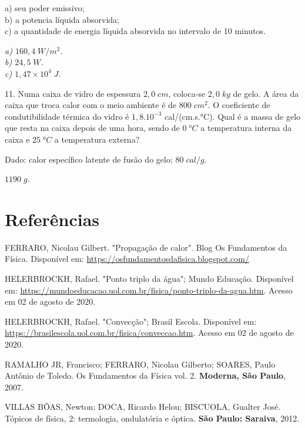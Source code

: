 \documentclass[12pt,twoside]{article}
\newenvironment{resposta*}
{\bf Resposta:\\ }
{}
\begin{document}
a) seu poder emissivo; \\
b) a potencia líquida absorvida; \\
c) a quantidade de energia líquida absorvida no intervalo de 10 minutos.


\begin{resposta*}
{\it a) $160,4\;W/m^{2}$. \\
b) $24,5\;W$. \\
c) $1,47\times 10^{4}\;J$.}
\end{resposta*}

11. Numa caixa de vidro de espessura $2,0\;cm$, coloca-se $2,0\;kg$ de gelo. A área da caixa que troca calor com o meio ambiente é de $800\;cm^{2}$. O coeficiente de condutibilidade térmica do vidro é $1,8.10^{-3}$ cal/(cm.s.°C). Qual é a massa de gelo que resta na caixa depois de uma hora, sendo de $0\;°C$ a temperatura interna da caixa e $25\;°C$ a temperatura externa?


Dado: calor específico latente de fusão do gelo: $80\;cal/g$.


\begin{resposta*}
{\it $1190\;g$.}
\end{resposta*}

\hypertarget{x-referências}{\section{Referências}}
FERRARO, Nicolau Gilbert. "Propagação de calor". Blog Os Fundamentos da Física. Disponível em: \href{https://osfundamentosdafisica.blogspot.com/}{https://osfundamentosdafisica.blogspot.com/}


HELERBROCKH, Rafael. "Ponto triplo da água"; Mundo Educação. Disponível em: \href{https://mundoeducacao.uol.com.br/fisica/ponto-triplo-da-agua.htm}{https://mundoeducacao.uol.com.br/fisica/ponto-triplo-da-agua.htm}. Acesso em 02 de agosto de 2020.


HELERBROCKH, Rafael. "Convecção"; Brasil Escola. Disponível em:\\ \href{https://brasilescola.uol.com.br/fisica/conveccao.htm}{https://brasilescola.uol.com.br/fisica/conveccao.htm}. Acesso em 02 de agosto de 2020.


RAMALHO JR, Francisco; FERRARO, Nicolau Gilberto; SOARES, Paulo Antônio de Toledo. Os Fundamentos da Física vol. 2. \textbf{Moderna, São Paulo}, 2007.


VILLAS BÔAS, Newton; DOCA, Ricardo Helou; BISCUOLA, Gualter José. Tópicos de física, 2: termologia, ondulatória e óptica. \textbf{São Paulo: Saraiva}, 2012.
\end{document}
